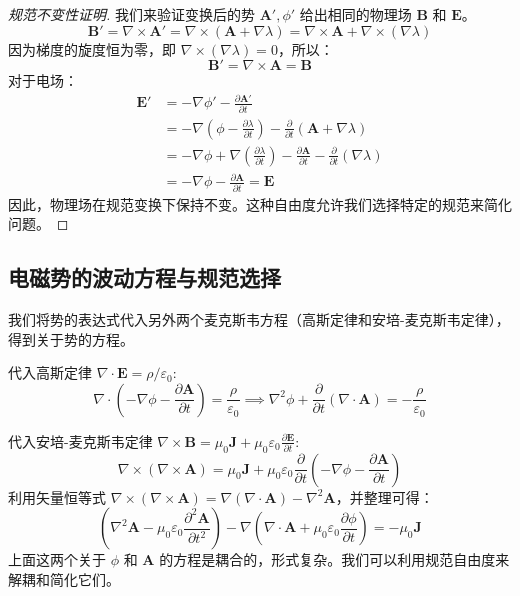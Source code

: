 \documentclass[fontset=none]{ctexart}
\begin{document}
\begin{proof}[规范不变性证明]
    我们来验证变换后的势 $\bm{A}', \phi'$ 给出相同的物理场 $\bm{B}$ 和 $\bm{E}$。
    \begin{equation}
        \bm{B}' = \nabla \times \bm{A}' = \nabla \times (\bm{A} + \nabla \lambda) = \nabla \times \bm{A} + \nabla \times (\nabla \lambda)
    \end{equation}
    因为梯度的旋度恒为零，即 $\nabla \times (\nabla \lambda) = 0$，所以：
    \begin{equation}
        \bm{B}' = \nabla \times \bm{A} = \bm{B}
    \end{equation}
    对于电场：
    \begin{equation}
        \begin{aligned}
            \bm{E}' &= -\nabla \phi' - \frac{\partial \bm{A}'}{\partial t} \\
            &= -\nabla \left(\phi - \frac{\partial \lambda}{\partial t}\right) - \frac{\partial}{\partial t}(\bm{A} + \nabla \lambda) \\
            &= -\nabla \phi + \nabla\left(\frac{\partial \lambda}{\partial t}\right) - \frac{\partial \bm{A}}{\partial t} - \frac{\partial}{\partial t}(\nabla \lambda) \\
            &= -\nabla \phi - \frac{\partial \bm{A}}{\partial t} = \bm{E}
        \end{aligned}
    \end{equation}
    因此，物理场在规范变换下保持不变。这种自由度允许我们选择特定的规范来简化问题。
\end{proof}

\subsection{电磁势的波动方程与规范选择}
我们将势的表达式代入另外两个麦克斯韦方程（高斯定律和安培-麦克斯韦定律），得到关于势的方程。

代入高斯定律 $\nabla \cdot \bm{E} = \rho/\varepsilon_0$:
\begin{equation}
    \nabla \cdot \left(-\nabla \phi - \frac{\partial \bm{A}}{\partial t}\right) = \frac{\rho}{\varepsilon_0} \implies \nabla^2 \phi + \frac{\partial}{\partial t}(\nabla \cdot \bm{A}) = -\frac{\rho}{\varepsilon_0}
\end{equation}

代入安培-麦克斯韦定律 $\nabla \times \bm{B} = \mu_0 \bm{J} + \mu_0 \varepsilon_0 \frac{\partial \bm{E}}{\partial t}$:
\begin{equation}
    \nabla \times (\nabla \times \bm{A}) = \mu_0 \bm{J} + \mu_0 \varepsilon_0 \frac{\partial}{\partial t}\left(-\nabla \phi - \frac{\partial \bm{A}}{\partial t}\right)
\end{equation}
利用矢量恒等式 $\nabla \times (\nabla \times \bm{A}) = \nabla(\nabla \cdot \bm{A}) - \nabla^2 \bm{A}$，并整理可得：
\begin{equation}
    \left(\nabla^2 \bm{A} - \mu_0 \varepsilon_0 \frac{\partial^2 \bm{A}}{\partial t^2}\right) - \nabla \left(\nabla \cdot \bm{A} + \mu_0 \varepsilon_0 \frac{\partial \phi}{\partial t}\right) = -\mu_0 \bm{J}
\end{equation}
上面这两个关于 $\phi$ 和 $\bm{A}$ 的方程是耦合的，形式复杂。我们可以利用规范自由度来解耦和简化它们。
\end{document}
